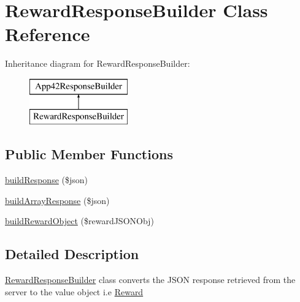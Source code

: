 \hypertarget{class_reward_response_builder}{\section{Reward\+Response\+Builder Class Reference}
\label{class_reward_response_builder}
}
Inheritance diagram for Reward\+Response\+Builder\+:\begin{figure}[H]
\begin{center}
\leavevmode
\includegraphics[height=2.000000cm]{class_reward_response_builder}
\end{center}
\end{figure}
\subsection*{Public Member Functions}
\begin{DoxyCompactItemize}
\item 
\hyperlink{class_reward_response_builder_a8bc94acdaada04a52b74b8f9afb25c4c}{build\+Response} (\$json)
\item 
\hyperlink{class_reward_response_builder_a901d0fc914904a6314c201378ce5f763}{build\+Array\+Response} (\$json)
\item 
\hyperlink{class_reward_response_builder_ace77939fe85de3af24cd3052bb0fd845}{build\+Reward\+Object} (\$reward\+J\+S\+O\+N\+Obj)
\end{DoxyCompactItemize}


\subsection{Detailed Description}
\hyperlink{class_reward_response_builder}{Reward\+Response\+Builder} class converts the J\+S\+O\+N response retrieved from the server to the value object i.\+e \hyperlink{class_reward}{Reward} 

